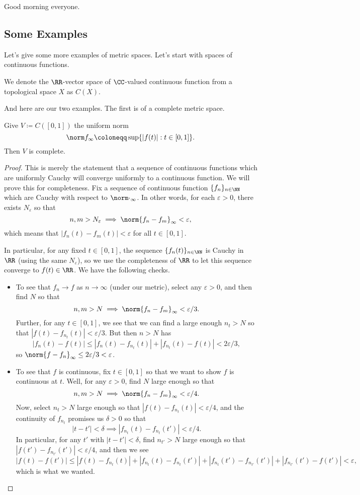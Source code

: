 \documentclass[../notes.tex]{subfiles}
\begin{document}
Good morning everyone.

\subsection{Some Examples}
Let's give some more examples of metric spaces. Let's start with spaces of continuous functions.
\begin{definition}
	We denote the $\RR$-vector space of $\CC$-valued continuous function from a topological space $X$ as $C(X)$.
\end{definition}
And here are our two examples. The first is of a complete metric space.
\begin{exe}
	Give $V\coloneqq C([0,1])$ the uniform norm
	\[\norm f_\infty\coloneqq\sup\{|f(t)|:t\in[0,1]\}.\]
	Then $V$ is complete.
\end{exe}
\begin{proof}
	This is merely the statement that a sequence of continuous functions which are uniformly Cauchy will converge uniformly to a continuous function. We will prove this for completeness. Fix a sequence of continuous function $\{f_n\}_{n\in\NN}$ which are Cauchy with respect to $\norm\cdot_\infty$. In other words, for each $\varepsilon>0$, there exists $N_\varepsilon$ so that
	\[n,m>N_\varepsilon\implies\norm{f_n-f_m}_\infty<\varepsilon,\]
	which means that $|f_n(t)-f_m(t)|<\varepsilon$ for all $t\in[0,1]$.

	In particular, for any fixed $t\in[0,1]$, the sequence $\{f_n(t)\}_{n\in\NN}$ is Cauchy in $\RR$ (using the same $N_\varepsilon$), so we use the completeness of $\RR$ to let this sequence converge to $f(t)\in\RR$. We have the following checks.
	\begin{itemize}
		\item To see that $f_n\to f$ as $n\to\infty$ (under our metric), select any $\varepsilon>0$, and then find $N$ so that
		\[n,m>N\implies\norm{f_n-f_m}_\infty<\varepsilon/3.\]
		Further, for any $t\in[0,1]$, we see that we can find a large enough $n_t>N$ so that $|f(t)-f_{n_t}(t)|<\varepsilon/3$. But then $n>N$ has
		\[|f_n(t)-f(t)|\le|f_n(t)-f_{n_t}(t)|+|f_{n_t}(t)-f(t)|<2\varepsilon/3,\]
		so $\norm{f-f_n}_\infty\le2\varepsilon/3<\varepsilon$.
		\item To see that $f$ is continuous, fix $t\in[0,1]$ so that we want to show $f$ is continuous at $t$. Well, for any $\varepsilon>0$, find $N$ large enough so that
		\[n,m>N\implies\norm{f_n-f_m}_\infty<\varepsilon/4.\]
		Now, select $n_t>N$ large enough so that $|f(t)-f_{n_t}(t)|<\varepsilon/4$, and the continuity of $f_{n_t}$ promises us $\delta>0$ so that
		\[|t-t'|<\delta\implies|f_{n_t}(t)-f_{n_t}(t')|<\varepsilon/4.\]
		In particular, for any $t'$ with $|t-t'|<\delta$, find $n_{t'}>N$ large enough so that $|f(t')-f_{n_{t'}}(t')|<\varepsilon/4$, and then we see
		\[|f(t)-f(t')|\le|f(t)-f_{n_t}(t)|+|f_{n_t}(t)-f_{n_{t}}(t')|+|f_{n_t}(t')-f_{n_{t'}}(t')|+|f_{n_{t'}}(t')-f(t')|<\varepsilon,\]
		which is what we wanted.
		\qedhere
	\end{itemize}
\end{proof}
\end{document}
